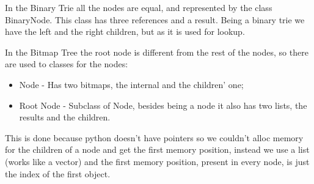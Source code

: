 \documentclass[]{report}
\begin{document}
In the Binary Trie all the nodes are equal, and represented by the class BinaryNode. This class has three references and a result. Being a binary trie we have the left and the right children, but as it is used for lookup.

In the Bitmap Tree the root node is different from the rest of the nodes, so there are used to classes for the nodes:
\begin{itemize}
\item Node - Has two bitmaps, the internal and the children’ one;
\item Root Node - Subclass of Node, besides being a node it also has two lists, the results and the children.
\end{itemize}
This is done because python doesn’t have pointers so we couldn’t alloc memory for the children of a node and get the first memory position, instead we use a list (works like a vector) and the first memory position, present in every node, is just the index of the first object.

\begin{minipage}{\linewidth}%

\label{fig:UML}
\end{minipage}
\end{document}
